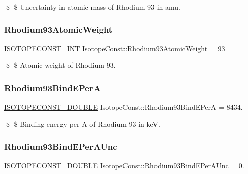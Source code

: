 \$ \$ Uncertainty in atomic mass of Rhodium-\/93 in amu. \mbox{\label{group___isotope_const-_rhodium-_rh93_gacc2c9017de163eda88f57500b1cc8405}} 
\subsubsection{\texorpdfstring{Rhodium93\+Atomic\+Weight}{Rhodium93AtomicWeight}}
{\footnotesize\ttfamily \mbox{\hyperlink{group___isotope_const-_macros_ga5f18360b3e99483a35c32d789e62621c}{I\+S\+O\+T\+O\+P\+E\+C\+O\+N\+S\+T\+\_\+\+I\+NT}} Isotope\+Const\+::\+Rhodium93\+Atomic\+Weight = 93}

\$ \$ Atomic weight of Rhodium-\/93. \mbox{\label{group___isotope_const-_rhodium-_rh93_ga74b4944596256e68ac8da4a5188afdf3}} 
\subsubsection{\texorpdfstring{Rhodium93\+Bind\+E\+PerA}{Rhodium93BindEPerA}}
{\footnotesize\ttfamily \mbox{\hyperlink{group___isotope_const-_macros_ga8f45a7272ce02c0b4c65c44636ed719a}{I\+S\+O\+T\+O\+P\+E\+C\+O\+N\+S\+T\+\_\+\+D\+O\+U\+B\+LE}} Isotope\+Const\+::\+Rhodium93\+Bind\+E\+PerA = 8434.}

\$ \$ Binding energy per A of Rhodium-\/93 in keV. \mbox{\label{group___isotope_const-_rhodium-_rh93_ga6626adc30206b301b1f06aafbbcd735e}} 
\subsubsection{\texorpdfstring{Rhodium93\+Bind\+E\+Per\+A\+Unc}{Rhodium93BindEPerAUnc}}
{\footnotesize\ttfamily \mbox{\hyperlink{group___isotope_const-_macros_ga8f45a7272ce02c0b4c65c44636ed719a}{I\+S\+O\+T\+O\+P\+E\+C\+O\+N\+S\+T\+\_\+\+D\+O\+U\+B\+LE}} Isotope\+Const\+::\+Rhodium93\+Bind\+E\+Per\+A\+Unc = 0.}

